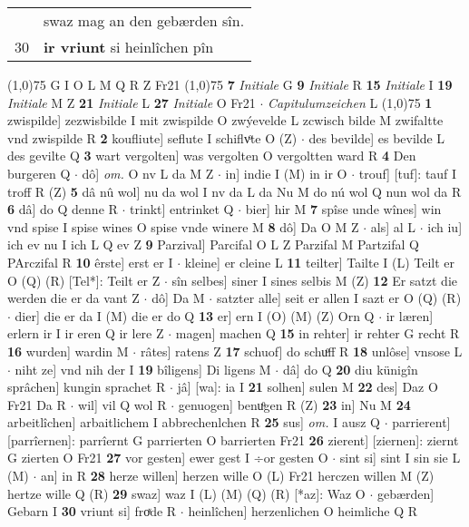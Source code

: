 \documentclass[8pt,a4paper,notitlepage]{article}
\begin{document}
\begin{table}[ht]
\begin{minipage}[t]{0.5\linewidth}
\begin{tabular}{rl}
 & swaz mag an den gebærden sîn.\\ 
30 & \textbf{ir vriunt} si heinlîchen pîn\\ 
\end{tabular}
\scriptsize
\line(1,0){75} \newline
G I O L M Q R Z Fr21 \newline
\line(1,0){75} \newline
\textbf{7} \textit{Initiale} G  \textbf{9} \textit{Initiale} R  \textbf{15} \textit{Initiale} I  \textbf{19} \textit{Initiale} M Z  \textbf{21} \textit{Initiale} L  \textbf{27} \textit{Initiale} O Fr21   $\cdot$ \textit{Capitulumzeichen} L  \newline
\line(1,0){75} \newline
\textbf{1} zwispilde] zezwisbilde I mit zwispilde O zwýevelde L zcwisch bilde M zwifaltte vnd zwispilde R \textbf{2} koufliute] seflute I schiflvͦte O (Z)  $\cdot$ des bevilde] es bevilde L des gevilte Q \textbf{3} wart vergolten] was vergolten O vergoltten ward R \textbf{4} Den burgeren Q  $\cdot$ dô] \textit{om.} O nv L da M Z  $\cdot$ in] indie I (M) in ir O  $\cdot$ trouf] [tuf]: tauf I troff R (Z) \textbf{5} dâ nû wol] nu da wol I nv da L da Nu M do nú wol Q nun wol da R \textbf{6} dâ] do Q denne R  $\cdot$ trinkt] entrinket Q  $\cdot$ bier] hir M \textbf{7} spîse unde wînes] win vnd spise I spise wines O spise vnde winere M \textbf{8} dô] Da O M Z  $\cdot$ als] al L  $\cdot$ ich iu] ich ev nu I ich L Q ev Z \textbf{9} Parzival] Parcifal O L Z Parzifal M Partzifal Q PArczifal R \textbf{10} êrste] erst er I  $\cdot$ kleine] er cleine L \textbf{11} teilter] Tailte I (L) Teilt er O (Q) (R) [Tel*]: Teilt er  Z  $\cdot$ sîn selbes] siner I sines selbis M (Z) \textbf{12} Er satzt die werden die er da vant Z  $\cdot$ dô] Da M  $\cdot$ satzter alle] seit er allen I sazt er O (Q) (R)  $\cdot$ dier] die er da I (M) die er do Q \textbf{13} er] ern I (O) (M) (Z) Orn Q  $\cdot$ ir læren] erlern ir I ir eren Q ir lere Z  $\cdot$ magen] machen Q \textbf{15} in rehter] ir rehter G recht R \textbf{16} wurden] wardin M  $\cdot$ râtes] ratens Z \textbf{17} schuof] do schuͦff R \textbf{18} unlôse] vnsose L  $\cdot$ niht ze] vnd nih der I \textbf{19} bîligens] Di ligens M  $\cdot$ dâ] do Q \textbf{20} diu künigîn sprâchen] kungin sprachet R  $\cdot$ jâ] [wa]: ia I \textbf{21} solhen] sulen M \textbf{22} des] Daz O Fr21 Da R  $\cdot$ wil] vil Q wol R  $\cdot$ genuogen] benuͦgen R (Z) \textbf{23} in] Nu M \textbf{24} arbeitlîchen] arbaitlichem I abbrechenlchen R \textbf{25} sus] \textit{om.} I ausz Q  $\cdot$ parrierent] [parrîernen]: parrîernt G parrierten O barrierten Fr21 \textbf{26} zierent] [ziernen]: ziernt G zierten O Fr21 \textbf{27} vor gesten] ewer gest I ÷or gesten O  $\cdot$ sint si] sint I sin sie L (M)  $\cdot$ an] in R \textbf{28} herze willen] herzen wille O (L) Fr21 herczen willen M (Z) hertze wille Q (R) \textbf{29} swaz] waz I (L) (M) (Q) (R) [*az]: Waz  O  $\cdot$ gebærden] Gebarn I \textbf{30} vriunt si] froͯde R  $\cdot$ heinlîchen] herzenlichen O heimliche Q R \newline

\end{minipage}
\end{table}
\end{document}
